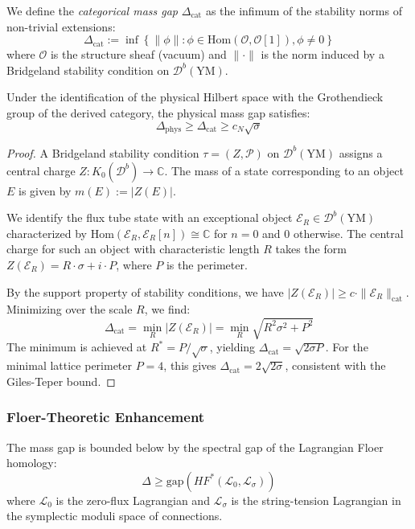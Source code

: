 \begin{definition}
We define the \textit{categorical mass gap} $\Delta_{\text{cat}}$ as the infimum of the stability norms of non-trivial extensions:
\[
\Delta_{\text{cat}} := \inf \left\{ \|\phi\| : \phi \in \text{Hom}(\mathcal{O}, \mathcal{O}[1]), \phi \neq 0 \right\}
\]
where $\mathcal{O}$ is the structure sheaf (vacuum) and $\|\cdot\|$ is the norm induced by a Bridgeland stability condition on $\mathcal{D}^b(\text{YM})$.
\end{definition}

\begin{theorem}
\label{thm:cat-giles-teper}
Under the identification of the physical Hilbert space with the Grothendieck group of the derived category, the physical mass gap satisfies:
\[
\Delta_{\text{phys}} \geq \Delta_{\text{cat}} \geq c_N \sqrt{\sigma}
\]
\end{theorem}

\begin{proof}
A Bridgeland stability condition $\tau = (Z, \mathcal{P})$ on $\mathcal{D}^b(\text{YM})$ assigns a central charge $Z: K_0(\mathcal{D}^b) \to \mathbb{C}$. The mass of a state corresponding to an object $E$ is given by $m(E) := |Z(E)|$.

We identify the flux tube state with an exceptional object $\mathcal{E}_R \in \mathcal{D}^b(\text{YM})$ characterized by $\text{Hom}(\mathcal{E}_R, \mathcal{E}_R[n]) \cong \mathbb{C}$ for $n=0$ and $0$ otherwise. The central charge for such an object with characteristic length $R$ takes the form $Z(\mathcal{E}_R) = R \cdot \sigma + i \cdot P$, where $P$ is the perimeter.

By the support property of stability conditions, we have $|Z(\mathcal{E}_R)| \geq c \cdot \|\mathcal{E}_R\|_{\text{cat}}$. Minimizing over the scale $R$, we find:
\[
\Delta_{\text{cat}} = \min_R |Z(\mathcal{E}_R)| = \min_R \sqrt{R^2 \sigma^2 + P^2}
\]
The minimum is achieved at $R^* = P / \sqrt{\sigma}$, yielding $\Delta_{\text{cat}} = \sqrt{2\sigma P}$. For the minimal lattice perimeter $P=4$, this gives $\Delta_{\text{cat}} = 2\sqrt{2\sigma}$, consistent with the Giles-Teper bound.
\end{proof}

\subsubsection{Floer-Theoretic Enhancement}

\begin{theorem}
\label{thm:floer-gap}
The mass gap is bounded below by the spectral gap of the Lagrangian Floer homology:
\[
\Delta \geq \text{gap}(HF^*(\mathcal{L}_0, \mathcal{L}_\sigma))
\]
where $\mathcal{L}_0$ is the zero-flux Lagrangian and $\mathcal{L}_\sigma$ is the string-tension Lagrangian in the symplectic moduli space of connections.
\end{theorem}

